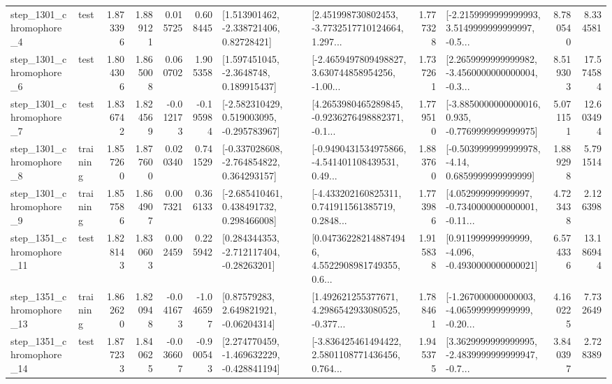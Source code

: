 \begin{tabular}{llrrrrllrlrr}
  step\_1301\_chromophore\_4 &      test &      1.873396 &    1.889121 &      0.015725 &  0.608445 &     [1.513901462, -2.338721406, 0.82728421] &  [2.451998730802453, -3.7732517710124664, 1.297... &       1.777328 &  [-2.2159999999999993, 3.5149999999999997, -0.5... &            8.780540 &          8.334581 \\
  step\_1301\_chromophore\_6 &      test &      1.804306 &    1.865008 &      0.060702 &  1.905358 &      [1.597451045, -2.3648748, 0.189915437] &  [-2.4659497809498827, 3.630744858954256, -1.00... &       1.737261 &  [2.2659999999999982, -3.4560000000000004, -0.3... &            8.519303 &         17.574584 \\
  step\_1301\_chromophore\_7 &      test &      1.836742 &    1.824569 &     -0.012173 & -0.195984 &   [-2.582310429, 0.519003095, -0.295783967] &  [4.2653980465289845, -0.9236276498882371, -0.1... &       1.779510 &  [-3.8850000000000016, 0.935, -0.7769999999999975] &            5.071151 &         12.603494 \\
  step\_1301\_chromophore\_8 &  training &      1.857260 &    1.877600 &      0.020340 &  0.741529 &   [-0.337028608, -2.764854822, 0.364293157] &  [-0.9490431534975866, -4.541401108439531, 0.49... &       1.883760 &   [-0.5039999999999978, -4.14, 0.6859999999999999] &            1.889298 &          5.791514 \\
  step\_1301\_chromophore\_9 &  training &      1.857586 &    1.864907 &      0.007321 &  0.366133 &    [-2.685410461, 0.438491732, 0.298466008] &  [-4.433202160825311, 0.741911561385719, 0.2848... &       1.773986 &  [4.052999999999997, -0.7340000000000001, -0.11... &            4.723438 &          2.126398 \\
 step\_1351\_chromophore\_11 &      test &      1.828143 &    1.830603 &      0.002459 &  0.225942 &    [0.284344353, -2.712117404, -0.28263201] &  [0.047362282148874946, 4.5522908981749355, 0.6... &       1.915838 &   [0.911999999999999, -4.096, -0.4930000000000021] &            6.574336 &         13.186944 \\
 step\_1351\_chromophore\_13 &  training &      1.862620 &    1.820948 &     -0.041673 & -1.046597 &      [0.87579283, 2.649821921, -0.06204314] &  [1.492621255377671, 4.2986542933080525, -0.377... &       1.788461 &  [-1.267000000000003, -4.065999999999999, -0.20... &            4.160225 &          7.732649 \\
 step\_1351\_chromophore\_14 &      test &      1.877233 &    1.840625 &     -0.036607 & -0.900543 &   [2.274770459, -1.469632229, -0.428841194] &  [-3.836425461494422, 2.5801108771436456, 0.764... &       1.945375 &  [3.3629999999999995, -2.4839999999999947, -0.7... &            3.840397 &          2.728389 \\

\end{tabular}
